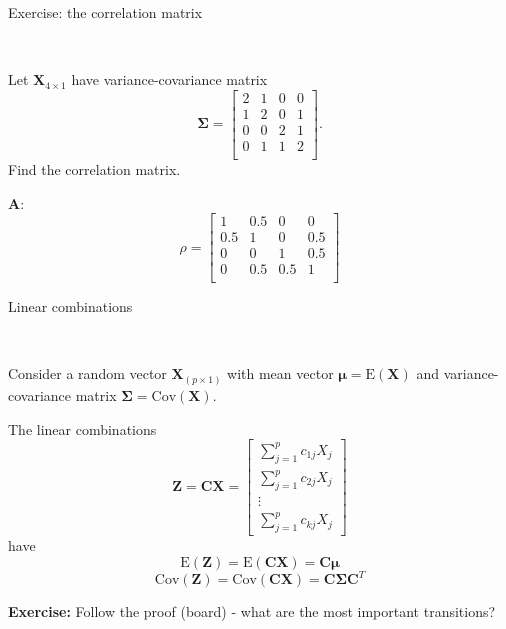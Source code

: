 \documentclass[ignorenonframetext,]{beamer}
\begin{document}
\begin{frame}

\begin{block}{Exercise: the correlation matrix}

\(~\)

Let \(\boldsymbol{X}_{4\times 1}\) have variance-covariance matrix
\[\boldsymbol\Sigma= \left[ \begin{array}{cccc} 2&1&0&0\\
      1&2&0&1\\
      0&0&2&1\\
      0&1&1&2\\
          \end{array}
          \right].\] Find the correlation matrix.

\end{block}

\end{frame}

\begin{frame}

\textbf{A}: \[\rho=\left[ \begin{array}{cccc} 1&0.5&0&0\\
      0.5&1&0&0.5\\
      0&0&1&0.5\\
      0&0.5&0.5&1\\
          \end{array}
          \right]\]

\end{frame}

\begin{frame}

\begin{block}{Linear combinations}

\(~\)

Consider a random vector \(\boldsymbol{X}_{(p\times 1)}\) with mean
vector \(\boldsymbol{\mu}=\text{E}(\boldsymbol{X})\) and
variance-covariance matrix
\(\boldsymbol\Sigma=\text{Cov}(\boldsymbol{X})\).

The linear combinations
\[\boldsymbol{Z}=\boldsymbol{C}\boldsymbol{X}=\left[ \begin{array}{c} \sum_{j=1}^p c_{1j}X_j\\ \sum_{j=1}^p c_{2j}X_j\\ \vdots \\ \sum_{j=1}^p c_{kj}X_j \end{array} \right]\]
have
\[\text{E}(\boldsymbol{Z})=\text{E}(\boldsymbol{C}\boldsymbol{X})=\boldsymbol{C}\boldsymbol{\mu}\]
\[\text{Cov}(\boldsymbol{Z})=\text{Cov}(\boldsymbol{C}\boldsymbol{X})=
   \boldsymbol{C}\boldsymbol\Sigma\boldsymbol{C}^T\]

\textbf{Exercise:} Follow the proof (board) - what are the most
important transitions?

\end{block}

\end{frame}
\end{document}
